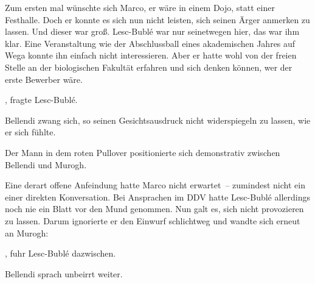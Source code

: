 \par

Zum ersten mal wünschte sich Marco, er wäre in einem Dojo, statt einer Festhalle. Doch er konnte es sich nun nicht leisten, sich seinen Ärger anmerken zu lassen. Und dieser war groß. Lesc-Bublé war nur seinetwegen hier, das war ihm klar. Eine Veranstaltung wie der Abschlussball eines akademischen Jahres auf Wega konnte ihn einfach nicht interessieren. Aber er hatte wohl von der freien Stelle an der biologischen Fakultät erfahren und sich denken können, wer der erste Bewerber wäre.

\par

, fragte Lesc-Bublé.

\par

 Bellendi zwang sich, so seinen Gesichtsausdruck nicht widerspiegeln zu lassen, wie er sich fühlte. 

\par

Der Mann in dem roten Pullover positionierte sich demonstrativ zwischen Bellendi und Murogh. 

\par

Eine derart offene Anfeindung hatte Marco nicht erwartet~-- zumindest nicht ein einer direkten Konversation. Bei Ansprachen im DDV hatte Lesc-Bublé allerdings noch nie ein Blatt vor den Mund genommen. Nun galt es, sich nicht provozieren zu lassen. Darum ignorierte er den Einwurf schlichtweg und wandte sich erneut an Murogh: 

\par

, fuhr Lesc-Bublé dazwischen. 

\par

Bellendi sprach unbeirrt weiter. 


